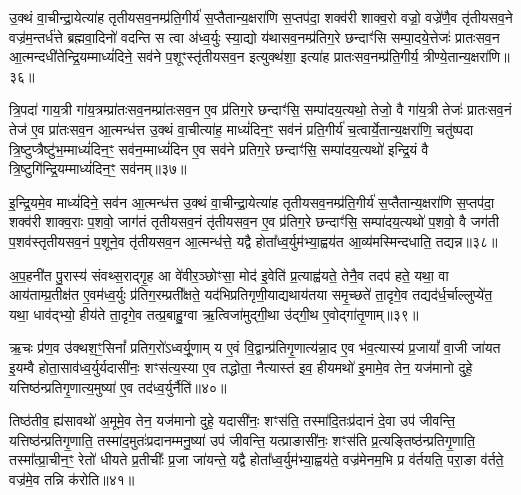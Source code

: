 उ॒क्थं वा॒चीन्द्रा॒येत्या॑ह तृतीयसव॒नम्प्र॑ति॒गीर्य॑ स॒प्तैतान्य॒क्षरा॑णि स॒प्तप॑दा॒ शक्व॑री शाक्व॒रो वज्रो॒ वज्रे॑णै॒व तृ॑तीयसव॒ने वज्र॑म॒न्तर्ध॑त्ते ब्रह्मवा॒दिनो॑ वदन्ति स त्वा अ॑ध्व॒र्युः स्या॒द्यो य॑थासव॒नम्प्र॑तिग॒रे छन्दाꣳ॑सि सम्पा॒दये॒त्तेजः॑ प्रातःसव॒न आ॒त्मन्दधी॑तेन्द्रि॒यम्माध्यं॑दिने॒ सव॑ने प॒शूꣳस्तृ॑तीयसव॒न इत्युक्थ॑शा॒ इत्या॑ह प्रातःसव॒नम्प्र॑ति॒गीर्य॒ त्रीण्ये॒तान्य॒क्षरा॑णि॥३६॥

त्रि॒पदा॑ गाय॒त्री गा॑य॒त्रम्प्रा॑तःसव॒नम्प्रा॑तःसव॒न ए॒व प्र॑तिग॒रे छन्दाꣳ॑सि॒ सम्पा॑दय॒त्यथो॒ तेजो॒ वै गा॑य॒त्री तेजः॑ प्रातःसव॒नं तेज॑ ए॒व प्रा॑तःसव॒न आ॒त्मन्ध॑त्त उ॒क्थं वा॒चीत्या॑ह॒ माध्यं॑दिन॒ꣳ॒ सव॑नं प्रति॒गीर्य॑ च॒त्वार्ये॒तान्य॒क्षरा॑णि॒ चतु॑ष्पदा त्रि॒ष्टुप्त्रैष्टु॑भ॒म्माध्यं॑दिन॒ꣳ॒ सव॑न॒म्माध्यं॑दिन ए॒व सव॑ने प्रतिग॒रे छन्दाꣳ॑सि॒ सम्पा॑दय॒त्यथो॑ इन्द्रि॒यं वै त्रि॒ष्टुगि॑न्द्रि॒यम्माध्यं॑दिन॒ꣳ॒ सव॑नम्॥३७॥

इ॒न्द्रि॒यमे॒व माध्यं॑दिने॒ सव॑न आ॒त्मन्ध॑त्त उ॒क्थं वा॒चीन्द्रा॒येत्या॑ह तृतीयसव॒नम्प्र॑ति॒गीर्य॑ स॒प्तैतान्य॒क्षरा॑णि स॒प्तप॑दा॒ शक्व॑री शाक्व॒राः प॒शवो॒ जाग॑तं तृतीयसव॒नं तृ॑तीयसव॒न ए॒व प्र॑तिग॒रे छन्दाꣳ॑सि॒ सम्पा॑दय॒त्यथो॑ प॒शवो॒ वै जग॑ती प॒शव॑स्तृतीयसव॒नं प॒शूने॒व तृ॑तीयसव॒न आ॒त्मन्ध॑त्ते॒ यद्वै होता᳚ध्व॒र्युम॑भ्या॒ह्वय॑त आ॒व्य॑मस्मिन्दधाति॒ तद्यन्न॥३८॥

अ॒प॒हनी॑त पु॒रास्य॑ संवथ्स॒राद्गृ॒ह आ वे॑वीर॒ञ्छोꣳसा॒ मोद॑ इ॒वेति॑ प्र॒त्याह्व॑यते॒ तेनै॒व तदप॑ हते॒ यथा॒ वा आय॑ताम्प्र॒तीक्ष॑त ए॒वम॑ध्व॒र्युः प्र॑तिग॒रम्प्रती᳚क्षते॒ यद॑भिप्रतिगृणी॒याद्यथाय॑तया समृ॒च्छते॑ ता॒दृगे॒व तद्यद॑र्ध॒र्चाल्लुप्ये॑त॒ यथा॒ धाव॑द्भ्यो॒ हीय॑ते ता॒दृगे॒व तत्प्र॒बाहु॒ग्वा ऋ॒त्विजा॑मुद्गी॒था उ॑द्गी॒थ ए॒वोद्गा॑तृ॒णाम्॥३९॥

ऋ॒चः प्र॑ण॒व उ॑क्थश॒ꣳ॒सिनां᳚ प्रतिग॒रो॑\-ऽध्वर्यू॒णाम् य ए॒वं वि॒द्वान्प्र॑तिगृ॒णात्य॑न्ना॒द ए॒व भ॑व॒त्यास्य॑ प्र॒जायां᳚ वा॒जी जा॑यत इ॒यम्वै होता॒साव॑ध्व॒र्युर्यदासी॑नः॒ शꣳस॑त्य॒स्या ए॒व तद्धोता॒ नैत्यास्त॑ इव॒ हीयमथो॑ इ॒मामे॒व तेन॒ यज॑मानो दुहे॒ यत्तिष्ठ॑न्प्रतिगृ॒णात्य॒मुष्या॑ ए॒व तद॑ध्व॒र्युर्नैति॑॥४०॥

तिष्ठ॑तीव॒ ह्य॑सावथो॑ अ॒मूमे॒व तेन॒ यज॑मानो दुहे॒ यदासी॑नः॒ शꣳस॑ति॒ तस्मा॑दि॒तःप्र॑दानं दे॒वा उप॑ जीवन्ति॒ यत्तिष्ठ॑न्प्रतिगृ॒णाति॒ तस्मा॑द॒मुतः॑प्रदानम्मनु॒ष्या॑ उप॑ जीवन्ति॒ यत्प्राङासी॑नः॒ शꣳस॑ति प्र॒त्यङ्तिष्ठ॑न्प्रतिगृ॒णाति॒ तस्मा᳚त्प्रा॒चीन॒ꣳ॒ रेतो॑ धीयते प्र॒तीचीः᳚ प्र॒जा जा॑यन्ते॒ यद्वै होता᳚ध्व॒र्युम॑भ्या॒ह्वय॑ते॒ वज्र॑मेनम॒भि प्र व॑र्तयति॒ परा॒ङा व॑र्तते॒ वज्र॑मे॒व तन्नि क॑रोति॥४१॥

{\anuvakamend[{सव॑ने॒ वज्र॑म॒न्तर्ध॑त्ते॒ त्रीण्ये॒तान्य॒क्षरा॑णीन्द्रि॒यम्माध्य॑न्दिन॒ꣳ॒ सव॑न॒न्नोद्गा॑तृ॒णाम॑ध्व॒र्युर्नैति॑ वर्तयत्य॒ष्टौ च॑॥९॥}]}

